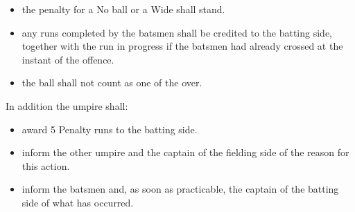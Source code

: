 \documentclass[12pt]{article}
\begin{document}
\vspace{\baselineskip}
\begin{itemize}
	\item {\fontsize{9pt}{10.8pt}\selectfont the penalty for a No ball or a Wide shall stand.\par}\par


\vspace{\baselineskip}
	\item {\fontsize{9pt}{10.8pt}\selectfont any runs completed by the batsmen shall be credited to the batting side, together with the run in progress if the batsmen had already crossed at the instant of the offence.\par}\par


\vspace{\baselineskip}
	\item {\fontsize{9pt}{10.8pt}\selectfont the ball shall not count as one of the over.\par}
\end{itemize}\par


\vspace{\baselineskip}
\begin{adjustwidth}{0.5in}{0.0in}
{\fontsize{9pt}{10.8pt}\selectfont In addition the umpire shall:\par}\par

\end{adjustwidth}


\vspace{\baselineskip}
\begin{itemize}
	\item {\fontsize{9pt}{10.8pt}\selectfont award 5 Penalty runs to the batting side.\par}\par


\vspace{\baselineskip}
	\item {\fontsize{9pt}{10.8pt}\selectfont inform the other umpire and the captain of the fielding side of the reason for this action.\par}\par


\vspace{\baselineskip}
	\item {\fontsize{9pt}{10.8pt}\selectfont inform the batsmen and, as soon as practicable, the captain of the batting side of what has occurred.\par}
\end{itemize}\par
\end{document}
